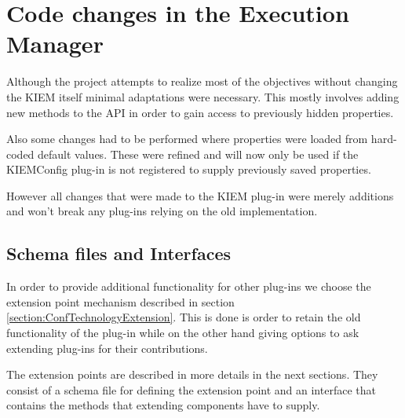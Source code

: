 \chapter{Code changes in the Execution Manager}
\label{chapter:KiemChanges}
Although the project attempts to realize most of the objectives without
changing the \ac{KIEM} itself minimal adaptations were necessary.
This mostly involves adding new methods to the \ac{API} in order to
gain access to previously hidden properties.

Also some changes had to be performed where properties were loaded from hard-coded 
default values. These were refined and will now only be used if the \ac{KIEMConfig} 
plug-in is not registered to supply previously saved properties.

However all changes that were made to the \ac{KIEM} plug-in were merely additions
and won't break any plug-ins relying on the old implementation.

\section{Schema files and Interfaces}
In order to provide additional functionality for other plug-ins we choose the extension
point mechanism described in section \ref{section:ConfTechnologyExtension}. This is done
is order to retain the old functionality of the plug-in while on the other hand giving
options to ask extending plug-ins for their contributions. 

The extension points are described in more details in the next sections. They consist
of a schema file for defining the extension point and an interface that contains the 
methods that extending components have to supply.

